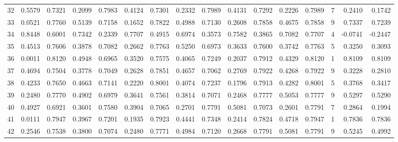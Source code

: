 \begin{tabular}{lrrrrrrrrrrrrrrr}
32  &      0.5579 &  0.7321 &  0.2099 &  0.7983 &  0.4124 &  0.7301 &  0.2332 &  0.7989 &  0.4131 &  0.7292 &   0.2226 &     0.7989 &      7 &                    0.2410 &                     0.1742 \\
33  &      0.0521 &  0.7760 &  0.5139 &  0.7158 &  0.1652 &  0.7822 &  0.4988 &  0.7130 &  0.2608 &  0.7858 &   0.4675 &     0.7858 &      9 &                    0.7337 &                     0.7239 \\
34  &      0.8448 &  0.6001 &  0.7342 &  0.2339 &  0.7707 &  0.4915 &  0.6974 &  0.3573 &  0.7582 &  0.3865 &   0.7082 &     0.7707 &      4 &                   -0.0741 &                    -0.2447 \\
35  &      0.4513 &  0.7606 &  0.3878 &  0.7082 &  0.2662 &  0.7763 &  0.5250 &  0.6973 &  0.3633 &  0.7600 &   0.3742 &     0.7763 &      5 &                    0.3250 &                     0.3093 \\
36  &      0.0011 &  0.8120 &  0.4948 &  0.6965 &  0.3520 &  0.7575 &  0.4065 &  0.7249 &  0.2037 &  0.7912 &   0.4329 &     0.8120 &      1 &                    0.8109 &                     0.8109 \\
37  &      0.4694 &  0.7504 &  0.3778 &  0.7049 &  0.2628 &  0.7851 &  0.4657 &  0.7062 &  0.2769 &  0.7922 &   0.4268 &     0.7922 &      9 &                    0.3228 &                     0.2810 \\
38  &      0.4233 &  0.7650 &  0.4663 &  0.7141 &  0.2220 &  0.8001 &  0.4074 &  0.7237 &  0.1796 &  0.7913 &   0.4282 &     0.8001 &      5 &                    0.3768 &                     0.3417 \\
39  &      0.2480 &  0.7770 &  0.4902 &  0.6979 &  0.3641 &  0.7561 &  0.3814 &  0.7071 &  0.2468 &  0.7777 &   0.5053 &     0.7777 &      9 &                    0.5297 &                     0.5290 \\
40  &      0.4927 &  0.6921 &  0.3601 &  0.7580 &  0.3904 &  0.7065 &  0.2701 &  0.7791 &  0.5081 &  0.7073 &   0.2601 &     0.7791 &      7 &                    0.2864 &                     0.1994 \\
41  &      0.0111 &  0.7947 &  0.3967 &  0.7201 &  0.1935 &  0.7923 &  0.4441 &  0.7348 &  0.2414 &  0.7824 &   0.4718 &     0.7947 &      1 &                    0.7836 &                     0.7836 \\
42  &      0.2546 &  0.7538 &  0.3800 &  0.7074 &  0.2480 &  0.7771 &  0.4984 &  0.7120 &  0.2668 &  0.7791 &   0.5081 &     0.7791 &      9 &                    0.5245 &                     0.4992 \\

\end{tabular}
